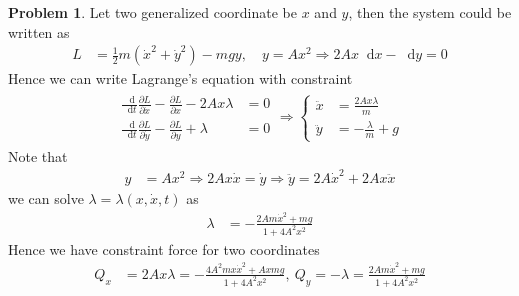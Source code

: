 \documentclass[twoside,11pt]{article}
\newcommand{\lms}{\fontfamily{lmss}\selectfont} %
\renewcommand*\d{\mathop{}\!\mathrm{d}}
\theoremstyle{definition}
\newtheorem{problem}{\lms Problem}
\theoremstyle{remark}
\begin{document}
\begin{problem}
Let two generalized coordinate be $x$ and $y$, then the system 
could be written as
\begin{align*}
    L &= \frac{1}{2}m(\dot{x}^2 + \dot{y}^2)
    - mgy,\quad
    y = Ax^2\Rightarrow
    2Ax\d x - \d y = 0
\end{align*}
Hence we can write Lagrange's equation with constraint
\begin{align*}
    \begin{aligned}
        \frac{\d}{\d t}\frac{\partial L}{\partial\dot{x}} - 
        \frac{\partial L}{\partial x} - 2Ax\lambda&= 0\\
        \frac{\d}{\d t}\frac{\partial L}{\partial\dot{y}} - 
        \frac{\partial L}{\partial y} + \lambda &= 0
    \end{aligned}
    \Rightarrow
    \left\{
    \begin{aligned}
        \ddot{x} &= \frac{2Ax\lambda}{m}\\
        \ddot{y} &= -\frac{\lambda}{m} + g
    \end{aligned}
    \right.
\end{align*}
Note that
\begin{align*}
    y &= Ax^2\Rightarrow
    2Ax\dot{x} = \dot{y}\Rightarrow
    \ddot{y} = 2A\dot{x}^2 + 2Ax\ddot{x}
\end{align*}
we can solve $\lambda=\lambda(x,\dot{x},t)$ as
\begin{align*}
    \lambda&= -\frac{2Am\dot{x}^2 + mg}{1 + 4A^2x^2}
\end{align*}
Hence we have constraint force for two coordinates
\begin{align*}
    Q_x &= 2Ax\lambda = -\frac{4A^2mx\dot{x}^2 + Axmg}{1 + 4A^2x^2},~
    Q_y = -\lambda = 
    \frac{2Am\dot{x}^2 + mg}{1 + 4A^2x^2}
\end{align*}
\end{problem}
\end{document}
